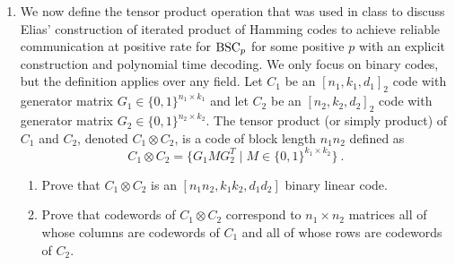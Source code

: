 \documentclass[11pt]{article}
\begin{document}
\begin{enumerate}
\item We now define the tensor product operation that was used in
  class to discuss Elias' construction of iterated product of Hamming
  codes to achieve reliable communication at positive rate for ${\rm
  BSC}_p$ for some positive $p$ with an explicit construction and
  polynomial time decoding. We only focus on binary codes, but the
  definition applies over any field. Let $C_1$ be an $[n_1,k_1,d_1]_2$
  code with generator matrix $G_1 \in \{0,1\}^{n_1 \times k_1}$ and let $C_2$ be an $[n_2,k_2,d_2]_2$
  code with generator matrix $G_2 \in \{0,1\}^{n_2 \times k_2}$. The
  tensor product (or simply product) of $C_1$ and $C_2$, denoted $C_1
  \otimes C_2$, is a code of block length $n_1 n_2$ defined as
\[ C_1 \otimes C_2  = \{ G_1 M G_2^T \mid M \in \{0,1\}^{k_1 \times
  k_2}  \} \ . \]
\begin{enumerate}
\item Prove that $C_1 \otimes C_2$ is an $[n_1 n_2, k_1 k_2, d_1 d_2]$
  binary linear code.
\item Prove that codewords of $C_1 \otimes C_2$ correspond to
  $n_1 \times n_2$ matrices all of whose columns are codewords of
  $C_1$ and all of whose rows are codewords of $C_2$.
\end{enumerate}
\end{enumerate}
\end{document}
